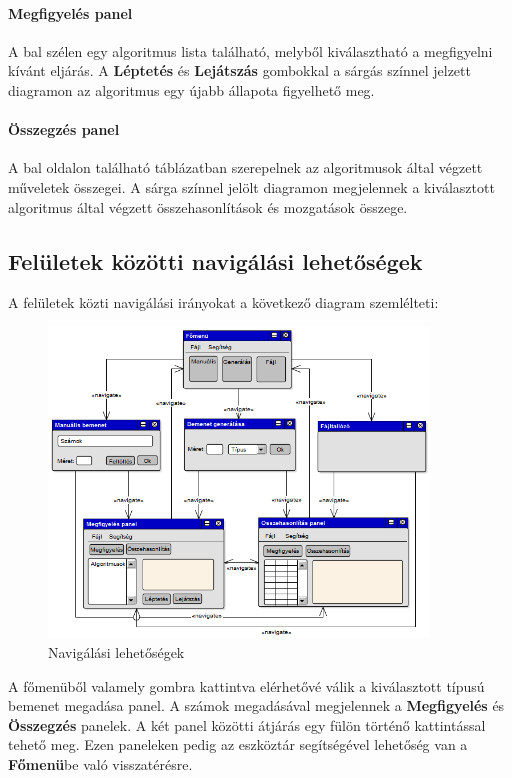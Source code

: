 \documentclass{elteikthesis}
\begin{document}
\paragraph{Megfigyelés panel}
A bal szélen egy algoritmus lista található, melyből kiválasztható a megfigyelni kívánt eljárás. A \textbf{Léptetés} és \textbf{Lejátszás} gombokkal a sárgás színnel jelzett diagramon az algoritmus egy újabb állapota figyelhető meg.
\paragraph{Összegzés panel}
A bal oldalon található táblázatban szerepelnek az algoritmusok által végzett műveletek összegei. A sárga színnel jelölt diagramon megjelennek a kiválasztott algoritmus által végzett összehasonlítások és mozgatások összege.

\subsection{Felületek közötti navigálási lehetőségek}
A felületek közti navigálási irányokat a következő diagram szemlélteti:
\begin{figure}[H]
	\centering
	\includegraphics[width=0.9\textwidth]{pics/plan_directions.png}
	\caption{Navigálási lehetőségek}
\end{figure}\par
A főmenüből valamely gombra kattintva elérhetővé válik a kiválasztott típusú bemenet megadása panel. A számok megadásával megjelennek a \textbf{Megfigyelés} és \textbf{Összegzés} panelek. A két panel közötti átjárás egy fülön történő kattintással tehető meg. Ezen paneleken pedig az eszköztár segítségével lehetőség van a \textbf{Főmenü}be való visszatérésre.
\end{document}
